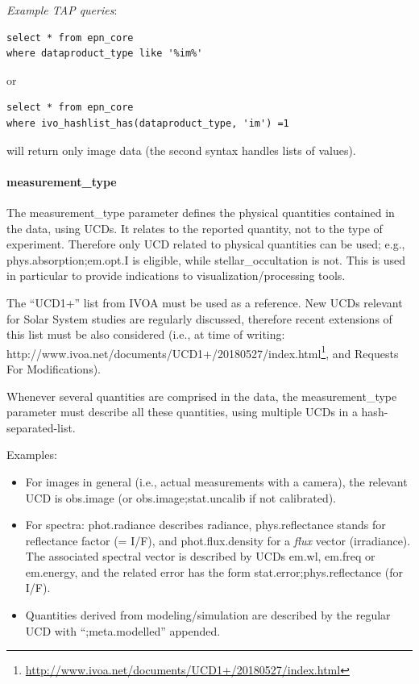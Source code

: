 \documentclass[11pt,a4paper]{ivoa}
\begin{document}
\emph{Example TAP queries}:

\begin{verbatim}
select * from epn_core 
where dataproduct_type like '%im%'
\end{verbatim}

or 

\begin{verbatim}
select * from epn_core 
where ivo_hashlist_has(dataproduct_type, 'im') =1
\end{verbatim}

will return only image data (the second syntax handles lists of values).

\paragraph{measurement\_type}

The measurement\_type parameter defines the physical quantities contained in the data, using UCDs. It relates to the reported quantity, not to the type of experiment. Therefore only UCD related to physical quantities can be used; e.g., phys.absorption;em.opt.I is eligible, while stellar\_occultation is not. This is used in particular to provide indications to visualization/processing tools.

The ``UCD1+'' list from IVOA must be used as a reference. New UCDs relevant for Solar System studies are regularly discussed, therefore recent extensions of this list must be also considered (i.e., at time of writing: http://www.ivoa.net/documents/UCD1+/20180527/index.html\footnote{\url{http://www.ivoa.net/documents/UCD1+/20180527/index.html}}, and Requests For Modifications). 

Whenever several quantities are comprised in the data, the measurement\_type parameter must describe all these quantities, using multiple UCDs in a hash-separated-list. 

Examples:

\begin{itemize}
\item For images in general (i.e., actual measurements with a camera), the relevant UCD is obs.image (or obs.image;stat.uncalib if not calibrated).
\item For spectra: phot.radiance describes radiance, phys.reflectance stands for reflectance factor (= I/F), and phot.flux.density for a \emph{flux} vector (irradiance). The associated spectral vector is described by UCDs em.wl, em.freq or em.energy, and the related error has the form stat.error;phys.reflectance (for I/F).
\item Quantities derived from modeling/simulation are described by the regular UCD with ``;meta.modelled'' appended. 
\end{itemize}
\end{document}
